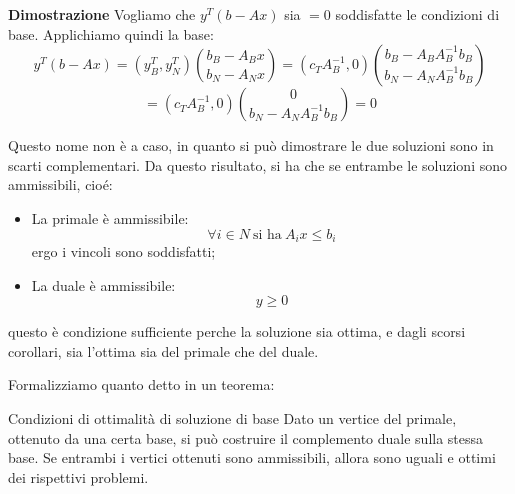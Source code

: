 \documentclass[a4paper,11pt]{article}
\begin{document}
\par\smallskip
\noindent 
\textbf{\textsf{Dimostrazione}}
Vogliamo che $y^T(b - Ax)$ sia $=0$ soddisfatte le condizioni di base.
Applichiamo quindi la base:
$$
y^T(b - Ax) = \left( y_B^T, y_N^T \right) \binom{b_B - A_B x}{b_N - A_N x} = \left( c_T A_B^{-1}, 0 \right) \binom{b_B - A_B A_B^{-1} b_B}{b_N - A_N A_B^{-1} b_B}
$$
$$
= \left( c_T A_B^{-1}, 0 \right) \binom{0}{b_N - A_N A_B^{-1} b_B} = 0
$$

Questo nome non è a caso, in quanto si può dimostrare le due soluzioni sono in scarti complementari.
Da questo risultato, si ha che se entrambe le soluzioni sono ammissibili, cioé:
\begin{itemize}
	\item La primale è ammissibile: 
		$$ \forall i \in N \ \text{si ha} \ A_i x \leq b_i $$
		ergo i vincoli sono soddisfatti;
	\item La duale è ammissibile:
		$$ y \geq 0$$
\end{itemize}
questo è condizione sufficiente perche la soluzione sia ottima, e dagli scorsi corollari, sia l'ottima sia del primale che del duale.

Formalizziamo quanto detto in un teorema:
\begin{theorem}{Condizioni di ottimalità di soluzione di base}
	Dato un vertice del primale, ottenuto da una certa base, si può costruire il complemento duale sulla stessa base.
	Se entrambi i vertici ottenuti sono ammissibili, allora sono uguali e ottimi dei rispettivi problemi.
\end{theorem}
\end{document}
